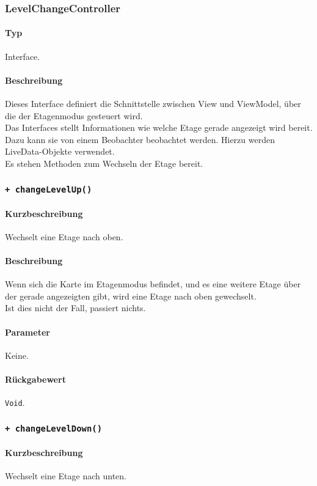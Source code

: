 \subsubsection{LevelChangeController}
\paragraph*{Typ}
Interface.
\paragraph*{Beschreibung}
Dieses Interface definiert die Schnittstelle zwischen View und ViewModel, über die 
der Etagenmodus gesteuert wird.\\
Das Interfaces stellt Informationen wie welche Etage gerade angezeigt wird bereit.
Dazu kann sie von einem Beobachter beobachtet werden. Hierzu werden LiveData-Objekte verwendet.\\
Es stehen Methoden zum Wechseln der Etage bereit.\\

\subsubsection*{\texttt{+ changeLevelUp()}}%
\paragraph*{Kurzbeschreibung}
Wechselt eine Etage nach oben.
\paragraph*{Beschreibung}
Wenn sich die Karte im Etagenmodus befindet, und es eine weitere Etage über der gerade 
angezeigten gibt, wird eine Etage nach oben gewechselt.\\
Ist dies nicht der Fall, passiert nichts.
\paragraph*{Parameter}
Keine.
\paragraph*{Rückgabewert}
\texttt{Void}.

\subsubsection*{\texttt{+ changeLevelDown()}}%
\paragraph*{Kurzbeschreibung}
Wechselt eine Etage nach unten.
